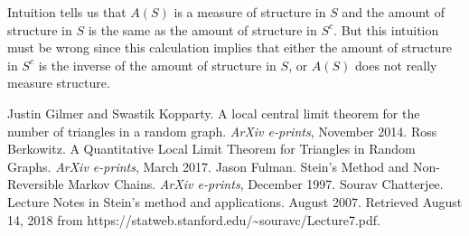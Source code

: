 \documentclass[12pt]{article} %
\theoremstyle{definition}
\theoremstyle{definition}
\begin{document}
Intuition tells us that $A(S)$ is a measure of structure in $S$ and the amount of structure in $S$ is the same as the amount of structure in $S^c$. But this intuition must be wrong since this calculation implies that either the amount of structure in $S^c$ is the inverse of the amount of structure in $S$, or $A(S)$ does not really measure structure. 


\begin{thebibliography}{0}
			Justin Gilmer and Swastik Kopparty.
			A local central limit theorem for the number of triangles in a random graph.
			\emph{ArXiv e-prints},
			November 2014.
			Ross Berkowitz.
            A Quantitative Local Limit Theorem for Triangles in Random Graphs.
			\emph{ArXiv e-prints},
			March 2017.
			Jason Fulman.
			Stein's Method and Non-Reversible Markov Chains.
			\emph{ArXiv e-prints},
			December 1997.
			Sourav Chatterjee.
			Lecture Notes in Stein's method and applications.
			August 2007.
			Retrieved August 14, 2018 from https://statweb.stanford.edu/\textasciitilde{}souravc/Lecture7.pdf.
\end{thebibliography}
\end{document}
